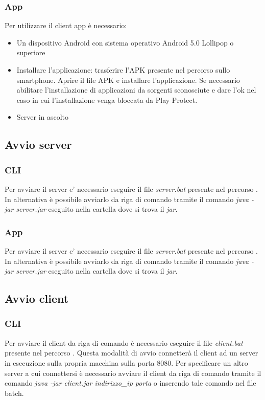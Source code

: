 \subsubsection{App}
\noindent Per utilizzare il client app è necessario:
\begin{itemize}[label=-]
  \item Un dispositivo Android con sistema operativo Android 5.0 Lollipop o superiore
  \item Installare l'applicazione: trasferire l'APK presente nel percorso  sullo smartphone. Aprire il file APK e installare l'applicazione. Se necessario abilitare l'installazione di applicazioni da sorgenti sconosciute e dare l'ok nel caso in cui l'installazione venga bloccata da Play Protect.
  \item Server in ascolto
\end{itemize}


\subsection{Avvio server}
\subsubsection{CLI}
\noindent Per avviare il server e' necessario eseguire il file \textit{server.bat} presente nel percorso . In alternativa è possibile avviarlo da riga di comando tramite il comando \textit{java -jar server.jar} eseguito nella cartella dove si trova il \textit{jar}.

\subsubsection{App}
\noindent Per avviare il server e' necessario eseguire il file \textit{server.bat} presente nel percorso . In alternativa è possibile avviarlo da riga di comando tramite il comando \textit{java -jar server.jar} eseguito nella cartella dove si trova il \textit{jar}.

\subsection{Avvio client}
\subsubsection{CLI}
\noindent Per avviare il client da riga di comando è necessario eseguire il file \textit{client.bat} presente nel percorso . Questa modalità di avvio connetterà il client ad un server in esecuzione sulla propria macchina sulla porta 8080. Per specificare un altro server a cui connettersi è necessario
avviare il client da riga di comando tramite il comando \textit{java -jar client.jar indirizzo\_ip porta} o inserendo tale comando nel file batch.


